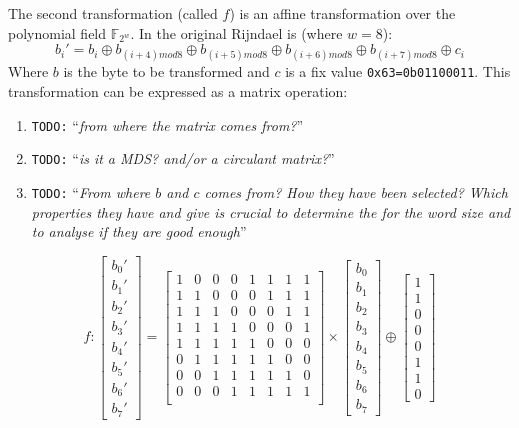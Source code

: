 \documentclass[10pt,a4paper,twoside]{llncs}
\newcommand{\todo}[1]{\texttt{\color{red}TODO:} ``\emph{#1}''}
\newcommand{\Fpn}[2]{\ensuremath{\mathbb{F}_{#1^#2}}}
\begin{document}
The second transformation (called $f$) is an affine transformation over the polynomial field \Fpn{2}{w}. In the original Rijndael is (where $w=8$):
\begin{equation}\label{eq:subBytes:affine}
 b_{i}' = b_{i} \oplus b_{(i+4)mod8} \oplus b_{(i+5)mod8} \oplus 
          b_{(i+6)mod8} \oplus b_{(i+7)mod8} \oplus c_{i}
\end{equation}
Where $b$ is the byte to be transformed and $c$ is a fix value \texttt{0x63=0b01100011}. This transformation can be expressed as a matrix operation:

\begin{enumerate}
 \item \todo{from where the matrix comes from?}
 \item \todo{is it a MDS? and/or a circulant matrix?}
 \item \todo{From where $b$ and $c$ comes from? How they have been selected? Which properties they have and give is crucial to determine the for the word size and to analyse if they are good enough}
\end{enumerate}

\begin{equation}\label{eq:subBytes:matrix}
 f:
 \left[
  \begin{array}{c}
    b_{0}'\\b_{1}'\\b_{2}'\\b_{3}'\\b_{4}'\\b_{5}'\\b_{6}'\\b_{7}'
  \end{array}
 \right]=\left[
  \begin{array}{cccccccc}
    1&0&0&0&1&1&1&1\\
    1&1&0&0&0&1&1&1\\
    1&1&1&0&0&0&1&1\\
    1&1&1&1&0&0&0&1\\
    1&1&1&1&1&0&0&0\\
    0&1&1&1&1&1&0&0\\
    0&0&1&1&1&1&1&0\\
    0&0&0&1&1&1&1&1\\
  \end{array}
 \right]\times\left[
  \begin{array}{c}
    b_{0}\\b_{1}\\b_{2}\\b_{3}\\b_{4}\\b_{5}\\b_{6}\\b_{7}
  \end{array}
 \right]\oplus\left[
  \begin{array}{c}
    1\\1\\0\\0\\0\\1\\1\\0
  \end{array}
 \right]
\end{equation}
\end{document}

